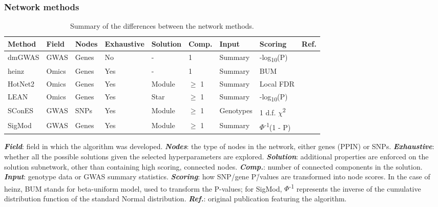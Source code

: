 \documentclass[draft,twocolumn, 11pt]{article}
\begin{document}
\subsubsection{Network methods}
\label{methods:methods}

\begin{table}[htbp]
  \caption{Summary of the differences between the network methods.}
  \label{tab:method_comparison}
  \centering
  \begin{threeparttable}
    \begin{tabular}{l|llllllll}
      Method & Field & Nodes & Exhaustive & Solution & Comp. & Input & Scoring & Ref.\\
      \hline
      dmGWAS & GWAS & Genes & No & - & 1 & Summary & -log\textsubscript{10}(P) & \cite{jia_dmgwas:_2011}\\
      heinz & Omics & Genes & Yes & - & 1 & Summary & BUM & \cite{dittrich_identifying_2008}\\
      HotNet2 & Omics & Genes & Yes & Module & \(\ge\) 1 & Summary & Local FDR & \cite{leiserson_pan-cancer_2015}\\
      LEAN & Omics & Genes & Yes & Star & \(\ge\) 1 & Summary & -log\textsubscript{10}(P) & \cite{gwinner_network-based_2016}\\
      SConES & GWAS & SNPs & Yes & Module & \(\ge\) 1 & Genotypes & 1 d.f. \(\chi\)\textsuperscript{2} & \cite{azencott_efficient_2013}\\
      SigMod & GWAS & Genes & Yes & Module & \(\ge\) 1 & Summary & $\Phi$\textsuperscript{-1}(1 - P) & \cite{liu_sigmod:_2017}\\
    \end{tabular}
    \begin{tablenotes}
      \footnotesize{
        \item \textbf{\emph{Field}}: field in which the algorithm was developed. \textbf{\emph{Nodes}}: the type of nodes in the network, either genes (PPIN) or SNPs. \textbf{\emph{Exhaustive}}: whether all the possible solutions given the selected hyperparameters are explored. \textbf{\emph{Solution}}: additional properties are enforced on the solution subnetwork, other than containing high scoring, connected nodes. \textbf{\emph{Comp.}}: number of connected components in the solution. \textbf{\emph{Input}}: genotype data or GWAS summary statistics. \textbf{\emph{Scoring}}: how SNP/gene P\=/values are transformed into node scores. In the case of heinz, BUM stands for beta-uniform model, used to transform the P-values; for SigMod, $\Phi$\textsuperscript{-1} represents the inverse of the
        cumulative distribution function of the standard Normal distribution. \textbf{\emph{Ref.}}: original publication featuring the algorithm.
      }
    \end{tablenotes}
  \end{threeparttable}
\end{table}
\end{document}
